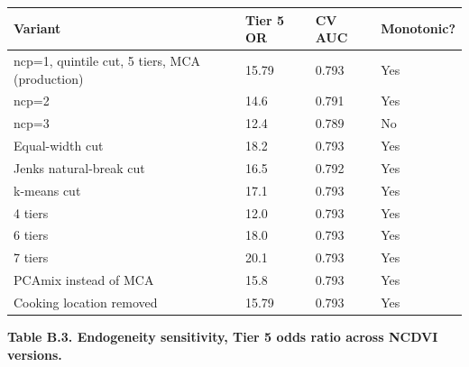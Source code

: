 \documentclass[
  12pt,
  a4paper]{article}
\newcounter{none} %
\begin{document}
{\def\LTcaptype{none} %
\begin{longtable}[]{@{}llll@{}}
\toprule\noalign{}
Variant & Tier 5 OR & CV AUC & Monotonic? \\
\midrule\noalign{}
\endhead
\bottomrule\noalign{}
\endlastfoot
ncp=1, quintile cut, 5 tiers, MCA (production) & 15.79 & 0.793 & Yes \\
ncp=2 & 14.6 & 0.791 & Yes \\
ncp=3 & 12.4 & 0.789 & No \\
Equal-width cut & 18.2 & 0.793 & Yes \\
Jenks natural-break cut & 16.5 & 0.792 & Yes \\
k-means cut & 17.1 & 0.793 & Yes \\
4 tiers & 12.0 & 0.793 & Yes \\
6 tiers & 18.0 & 0.793 & Yes \\
7 tiers & 20.1 & 0.793 & Yes \\
PCAmix instead of MCA & 15.8 & 0.793 & Yes \\
Cooking location removed & 15.79 & 0.793 & Yes \\
\end{longtable}
}

\textbf{Table B.3. Endogeneity sensitivity, Tier 5 odds ratio across NCDVI versions.}
\end{document}
